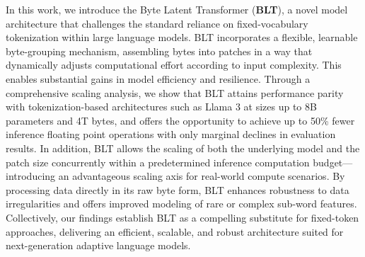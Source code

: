 In this work, we introduce the Byte Latent Transformer (\textbf{BLT}), a novel model architecture that challenges the standard reliance on fixed-vocabulary tokenization within large language models. {\textsc BLT} incorporates a flexible, learnable byte-grouping mechanism, assembling bytes into patches in a way that dynamically adjusts computational effort according to input complexity. This enables substantial gains in model efficiency and resilience. Through a comprehensive scaling analysis, we show that {\textsc BLT} attains performance parity with tokenization-based architectures such as Llama 3 at sizes up to 8B parameters and 4T bytes, and offers the opportunity to achieve up to 50\% fewer inference floating point operations with only marginal declines in evaluation results. In addition, {\textsc BLT} allows the scaling of both the underlying model and the patch size concurrently within a predetermined inference computation budget—introducing an advantageous scaling axis for real-world compute scenarios. By processing data directly in its raw byte form, {\textsc BLT} enhances robustness to data irregularities and offers improved modeling of rare or complex sub-word features. Collectively, our findings establish {\textsc BLT} as a compelling substitute for fixed-token approaches, delivering an efficient, scalable, and robust architecture suited for next-generation adaptive language models.

